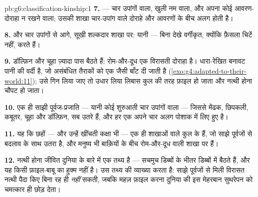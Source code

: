\begin{solution}{pb:g6:classification-kinship:1}
\textbf{7.}  --- चार उपांगों वाला, खुली नम  वाला, और अपना
कोई आवरण-दोराहा न रखने वाला; उसकी शाखा चार-उपांग वाले दोराहे और आवरणों
के बीच अलग होती है।

\textbf{8.}  और चार उपांगों से आगे, सूखी शल्कदार शाखा पर: यानी
 --- बिना देखे वर्गीकृत, क्योंकि फ़ैसला चिटें नहीं, 
करते हैं।

\textbf{9.} डॉल्फ़िन और चूहा ज़्यादा पास बैठते हैं: रोम-और-दूध एक
विरासती दोराहा है। धारा-रेखित बनावट पानी की वर्दी है, जो असंबंधित
तैराकों को एक जैसी बाँट दी जाती है
(\cref{exo:g4:adapted-to-their-world:11}); उसे गिन लिया जाए तो उधार
लिया लिबास कुल की तरह फ़ाइल हो जाता और नत्थी होना चौपट हो जाता।

\textbf{10.} एक ही साझी पूर्वज-प्रजाति --- यानी कोई शुरुआती चार उपांगों
वाला  --- जिससे मेंढक, छिपकली, कबूतर, चूहा और डॉल्फ़िन, सब उतरे
हैं, और हर एक अपने चार  अलग पोशाक में लिए हुए है।

\textbf{11.} यह कि छहों --- और उन्हें खींचती कक्षा भी --- एक ही शाखाओं
वाले कुल के हैं, जो साझे पूर्वजों से बदलाव के साथ उतरा है, और मनुष्य भी
बाक़ियों के बीच रोम-और-दूध वाली शाखा पर हैं।

\textbf{12.} नत्थी होना जीवित दुनिया के बारे में एक तथ्य है ---
 सचमुच डिब्बों के भीतर डिब्बों में बैठते हैं, और यह किसी
फ़ाइल-बाबू का हुक्म नहीं है।  उस तथ्य की व्याख्या करता है: साझे
पूर्वजों से मिली विरासत नत्थी  पैदा किए बिना रह ही \emph{नहीं}
सकती, जबकि महज़ फ़ाइल करना दुनिया की इस मेहरबान सुथरेपन को चमत्कार ही
छोड़ देता।
\end{solution}
